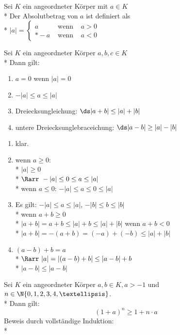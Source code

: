 	Sei $K$ ein angeordneter Körper mit $a \in K$\\*
	Der Absolutbetrag von $a$ ist definiert als \\*
	$|a| = \left\lbrace \begin{array}{rcr}
	a&\text{ wenn }&a > 0\\*
	-a&\text{ wenn }&a < 0
	\end{array}\right.$

	Sei $K$ ein angeordneter Körper $a, b, c \in K$\\*
	Dann gilt:
	\begin{enumerate}
	\item{$a = 0$ wenn $|a| = 0$}
	\item{$-|a| \leq a \leq |a|$}
	\item{Dreiecksungleichung: $\ds |a + b| \leq |a| + |b|$}
	\item{untere Dreiecksunglebraceichung: $\ds |a - b| \geq |a| - |b|$}
	\end{enumerate}
\bew
	\begin{enumerate}
	\item{klar.}
	\item{wenn $a \geq 0$:\\*
	$|a| \geq 0$\\*
	$\Rarr\ -|a| \leq 0 \leq a \leq |a|$\\*
	wenn $a \leq 0$:
	$-|a| \leq a \leq 0 \leq |a|$}
	\item{Es gilt: $-|a| \leq a \leq |a|$, $-|b| \leq b \leq |b|$\\*
	wenn $a + b \geq 0$\\*
	$|a + b| = a + b \leq |a| + b \leq |a| + |b|$
	wenn $a + b < 0$\\*
	$|a + b| = -(a + b) = (-a) + (-b) \leq |a| + |b|$}
	\item{$(a - b) + b = a$\\*
	$\Rarr\ |a| = |(a - b) + b| \leq |a - b| + b$\\*
	$|a - b| \leq |a - b|$} %
	\end{enumerate}

	Sei $K$ ein angeordneter Körper $a, b \in K, a > -1$ und $n \in \N \{0, 1, 2, 3, 4, …\}$.\\*
	Dann gilt:
	$$(1 + a)^n \geq 1 + n \cdot a$$
	Beweis durch vollständige Induktion:\\*

